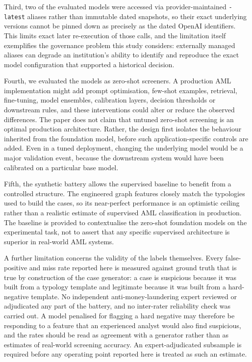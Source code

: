 \documentclass[pdflatex,sn-basic,Numbered]{sn-jnl}
\newcommand{\HLtext}[1]{\texthl{#1}}
\newcommand{\HLdel}[1]{\textcolor{HLink}{\sout{#1}}}
\renewcommand{\HLtext}[1]{#1}\renewcommand{\HLdel}[1]{#1}%
\begin{document}
Third, two of the evaluated models were accessed via provider-maintained \texttt{-latest} aliases rather than immutable dated snapshots, so their exact underlying versions cannot be pinned down as precisely as the dated OpenAI identifiers. This limits exact later re-execution of those calls, and the limitation itself exemplifies the governance problem this study considers: externally managed aliases can degrade an institution's ability to identify and reproduce the exact model configuration that supported a historical decision.

Fourth, we evaluated the models as zero-shot screeners. A production AML implementation might add prompt optimisation, few-shot examples, retrieval, fine-tuning, model ensembles, calibration layers, decision thresholds or downstream rules, and these interventions could alter or reduce the observed differences. The paper does not claim that untuned zero-shot screening is an optimal production architecture. Rather, the design first isolates the behaviour inherited from the foundation model, before such application-specific controls are added. Even in a tuned deployment, changing the underlying model would be a major validation event, because the downstream system would have been calibrated on a particular base model.

Fifth, the synthetic battery allows the supervised baseline to benefit from a controlled structure. The engineered graph features closely match the typologies used to build the cases, so its near-perfect performance is an optimistic ceiling rather than a realistic estimate of supervised AML classification in production. The baseline is provided to contextualise the zero-shot foundation models on the experimental task, not to assert that any specific supervised architecture is superior in real-world AML systems.

\HLtext{A further limitation concerns the validity of the labels themselves. Every false-positive and miss rate reported here is measured against ground truth that is true by construction of the case generator: a case is suspicious because it was built from a typology template and legitimate because it was built from a hard-negative template. No independent anti-money-laundering expert reviewed or adjudicated any part of the battery, and no inter-rater reliability check was carried out. A model penalised for flagging a hard negative may therefore be responding to a feature that an experienced analyst would also find suspicious, and the rates should be read as agreement with a generator rather than as estimates of real-world screening accuracy. An expert-adjudicated subsample is required before any operating point reported here is treated as such an estimate.}
\end{document}
